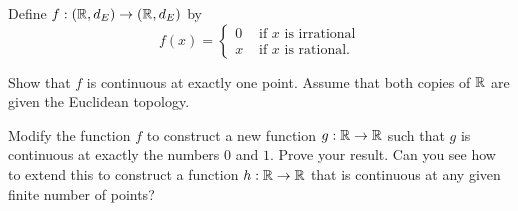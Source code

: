 \item Define $f : (\mathbb{R},d_E) \to (\mathbb{R},d_E)$ by 
\[f(x) = \begin{cases} 0 &\text{ if } x \text{ is irrational} \\ x &\text{ if } x \text{ is rational.} \end{cases}\]

\ba

\item Show that $f$ is continuous at exactly one point. Assume that both copies of $\mathbb{R}$ are given the Euclidean topology.

\item Modify the function $f$ to construct a new function $g: \mathbb{R} \to \mathbb{R}$ such that $g$ is continuous at exactly the numbers $0$ and $1$. Prove your result. Can you see how to extend this to construct a function $h: \mathbb{R} \to \mathbb{R}$ that is continuous at any given finite number of points? 

\ea

